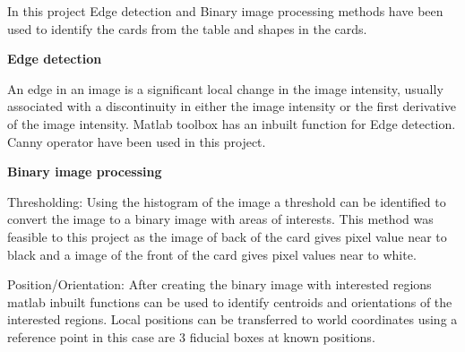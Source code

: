In this project Edge detection and Binary image processing methods have been used to identify the cards from the table and shapes in the cards.

\textbf{Edge detection}

An edge in an image is a significant local change in the image intensity, usually associated with a discontinuity in either the image intensity or the first derivative of the image intensity. Matlab toolbox has an inbuilt function for Edge detection. Canny operator have been used in this project.

\textbf{Binary image processing}

Thresholding: Using the histogram of the image a threshold can be identified to convert the image to a binary image with areas of interests. This method was feasible to this project as the image of back of the card gives pixel value near to black and a image of the front of the card gives pixel values near to white.

Position/Orientation: After creating the binary image with interested regions matlab inbuilt functions can be used to identify centroids and orientations of the interested regions. Local positions can be transferred to world coordinates using a reference point in this case are 3 fiducial boxes at known positions.




